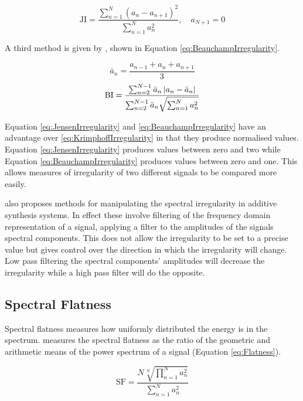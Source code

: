 		\begin{equation}
			\textrm{JI} = \frac{\sum_{n = 1}^{N} (a_{n} - a_{n+1})^{2}}
			                   {\sum_{n = 1}^{N} a_{n}^{2}},
			              \quad a_{N+1} = 0
			\label{eq:JensenIrregularity}
		\end{equation}

		A third method is given by \citet{beauchamp2007analysis}, shown in Equation \ref{eq:BeauchampIrregularity}.

		\[ \bar{a}_{n} = \frac{a_{n-1} + a_{n} + a_{n+1}}{3} \]
		\begin{equation}
			\textrm{BI} = \frac{\sum_{n = 2}^{N - 1} \bar{a}_{n} \left|a_{n} - \bar{a}_{n}\right|}
					   {\sum_{n = 2}^{N - 1} \bar{a}_{n} \sqrt{\sum_{n = 1}^{N} a_{n}^{2}}}
			\label{eq:BeauchampIrregularity}
		\end{equation}

		Equation \ref{eq:JensenIrregularity} and \ref{eq:BeauchampIrregularity} have an advantage over
		\ref{eq:KrimphoffIrregularity} in that they produce normalised values. Equation \ref{eq:JensenIrregularity}
		produces values between zero and two while Equation \ref{eq:BeauchampIrregularity} produces values between
		zero and one. This allows measures of irregularity of two different signals to be compared more easily.

		\citet{beauchamp2007analysis} also proposes methods for manipulating the spectral irregularity in additive
		synthesis systems. In effect these involve filtering of the frequency domain representation of a signal,
		applying a filter to the amplitudes of the signals spectral components. This does not allow the
		irregularity to be set to a precise value but gives control over the direction in which the irregularity
		will change. Low pass filtering the spectral components' amplitudes will decrease the irregularity while a
		high pass filter will do the opposite.

	\subsection{Spectral Flatness}
	\label{sec:FetureControl-Parameterisation-Flatness}
		Spectral flatness measures how uniformly distributed the energy is in the spectrum.
		\citet{johnston1988transform} measures the spectral flatness as the ratio of the geometric and arithmetic
		means of the power spectrum of a signal (Equation \ref{eq:Flatness}).

		\begin{equation}
			\textrm{SF} = \frac{N\sqrt[N]{\prod_{n = 1}^{N} a_{n}^{2}}}
				           {\sum_{n = 1}^{N} a_{n}^{2}}
			\label{eq:Flatness}
		\end{equation}

